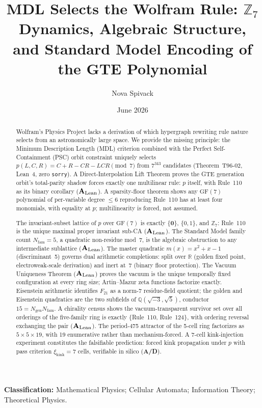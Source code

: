 \documentclass[11pt]{article}
\theoremstyle{remark}
\newcommand{\ZS}{\ensuremath{\mathbb{Z}_7}}
\newcommand{\GF}[1]{\ensuremath{\mathrm{GF}(#1)}}
\newcommand{\CatAL}{\texorpdfstring{\ensuremath{\textbf{A}_{\rm Lean}}}{A-Lean}}
\newcommand{\CatAD}{\textbf{A/D}}
\begin{document}
\title{\textbf{MDL Selects the Wolfram Rule: $\mathbb{Z}_7$ Dynamics,
Algebraic Structure, and Standard Model Encoding of the GTE Polynomial}}

\author{Nova Spivack}
\date{June 2026}
\maketitle

\NovaZenodoAfterTitle

\noindent\textbf{Classification:} Mathematical Physics; Cellular Automata;
Information Theory; Theoretical Physics.

\begin{abstract}
Wolfram's Physics Project lacks a derivation of which hypergraph rewriting
rule nature selects from an astronomically large space.
We provide the missing principle: the Minimum Description Length (MDL)
criterion combined with the Perfect Self-Containment (PSC) orbit constraint
uniquely selects
$p(L,C,R) = C+R-CR-LCR \pmod{7}$
from $7^{343}$ candidates (Theorem~T96-02, Lean~4, zero \texttt{sorry}).
A Direct-Interpolation Lift Theorem proves the GTE generation orbit's
total-parity shadow forces exactly one multilinear rule: $p$ itself, with
Rule~110 as its binary corollary (\CatAL).
A sparsity-floor theorem shows any $\GF{7}$ polynomial of per-variable
degree ${\leq}6$ reproducing Rule~110 has at least four monomials, with
equality at $p$; multilinearity is forced, not assumed.

The invariant-subset lattice of $p$ over $\GF{7}$ is exactly
$\{\mathbf{0}\}$, $\{0,1\}$, and $\ZS$: Rule~110 is the unique maximal
proper invariant sub-CA (\CatAL).
The Standard Model family count $N_{\mathrm{fam}}=5$, a quadratic
non-residue mod~7, is the algebraic obstruction to any intermediate
sublattice (\CatAL).
The master quadratic $m(x)=x^2+x-1$ (discriminant~5) governs dual
arithmetic completions: split over $\mathbb{R}$ (golden fixed point,
electroweak-scale derivation) and inert at~7 (binary floor protection).
The Vacuum Uniqueness Theorem (\CatAL) proves the vacuum is the unique
temporally fixed configuration at every ring size; Artin--Mazur zeta
functions factorize exactly.
Eisenstein arithmetic identifies $F_{21}$ as a norm-7 residue-field
quotient; the golden and Eisenstein quadratics are the two subfields of
$\mathbb{Q}(\sqrt{-3},\sqrt{5})$, conductor $15=N_{\mathrm{gen}}N_{\mathrm{fam}}$.
A chirality census shows the vacuum-transparent survivor set over all
orderings of the five-family ring is exactly $\{$Rule~110, Rule~124$\}$,
with ordering reversal exchanging the pair (\CatAL).
The period-475 attractor of the 5-cell ring factorizes as
$5{\times}5{\times}19$, with 19 enumerative rather than mechanism-forced.
A 7-cell kink-injection experiment constitutes the falsifiable prediction:
forced kink propagation under $p$ with pass criterion
$\xi_{\mathrm{kink}}=7$ cells, verifiable in silico (\CatAD).
\end{abstract}
\end{document}
